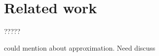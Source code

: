 \section*{Related work}
\label{section:relatedwork}

?????

could mention about approximation. Need discuss